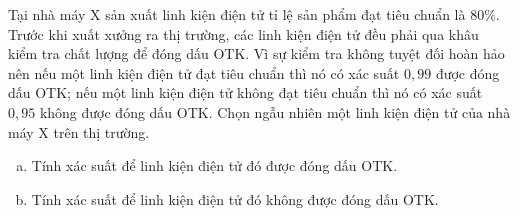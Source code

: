 \begin{vd}%
	Tại nhà máy X sản xuất linh kiện điện tử tỉ lệ sản phẩm đạt tiêu chuẩn là $80 \%$. Trước khi xuất xưởng ra thị trường, các linh kiện điện tử đều phải qua khâu kiểm tra chất lượng để đóng dấu OTK. Vì sự kiểm tra không tuyệt đối hoàn hảo nên nếu một linh kiện điện tử đạt tiêu chuẩn thì nó có xác suất $ 0{,}99 $ được đóng dấu OTK; nếu một linh kiện điện tử không đạt tiêu chuẩn thì nó có xác suất $ 0{,}95 $ không được đóng dấu OTK. Chọn ngẫu nhiên một linh kiện điện tử của nhà máy X trên thị trường.
	\begin{enumerate}[a)]
		\item Tính xác suất để linh kiện điện tử đó được đóng dấu OTK.
		\item Tính xác suất để linh kiện điện tử đó không được đóng dấu OTK.
	\end{enumerate}


\end{vd}
